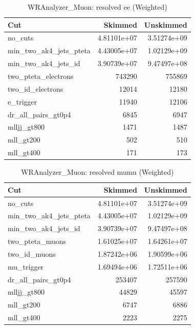 \documentclass{article}
\begin{document}
\begin{table}[htbp]
\centering
\caption{WRAnalyzer\_Muon: resolved ee (Weighted)}
\begin{tabular}{lrr}
\hline
Cut & Skimmed & Unskimmed \\
\hline
no\_cuts & 4.81101e+07 & 3.51274e+09 \\
min\_two\_ak4\_jets\_pteta & 4.43005e+07 & 1.02129e+09 \\
min\_two\_ak4\_jets\_id & 3.90739e+07 & 9.47497e+08 \\
two\_pteta\_electrons & 743290 & 755869 \\
two\_id\_electrons & 12014 & 12180 \\
e\_trigger & 11940 & 12106 \\
dr\_all\_pairs\_gt0p4 & 6845 & 6947 \\
mlljj\_gt800 & 1471 & 1487 \\
mll\_gt200 & 502 & 510 \\
mll\_gt400 & 171 & 173 \\
\hline
\end{tabular}
\end{table}

\begin{table}[htbp]
\centering
\caption{WRAnalyzer\_Muon: resolved mumu (Weighted)}
\begin{tabular}{lrr}
\hline
Cut & Skimmed & Unskimmed \\
\hline
no\_cuts & 4.81101e+07 & 3.51274e+09 \\
min\_two\_ak4\_jets\_pteta & 4.43005e+07 & 1.02129e+09 \\
min\_two\_ak4\_jets\_id & 3.90739e+07 & 9.47497e+08 \\
two\_pteta\_muons & 1.61025e+07 & 1.64261e+07 \\
two\_id\_muons & 1.87242e+06 & 1.90599e+06 \\
mu\_trigger & 1.69494e+06 & 1.72511e+06 \\
dr\_all\_pairs\_gt0p4 & 253407 & 257590 \\
mlljj\_gt800 & 44829 & 45597 \\
mll\_gt200 & 6747 & 6886 \\
mll\_gt400 & 2223 & 2275 \\
\hline
\end{tabular}
\end{table}
\end{document}
